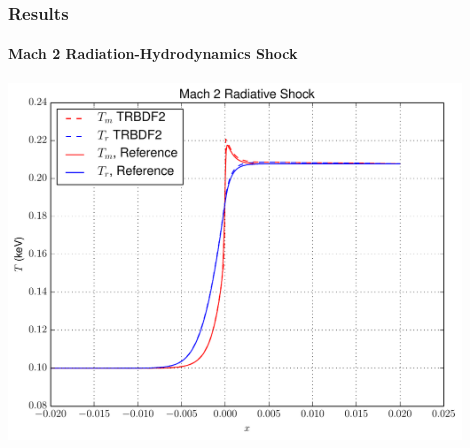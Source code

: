 \documentclass{beamer}
\begin{document}
\begin{frame}
\frametitle{Results}
\framesubtitle{Mach 2 Radiation-Hydrodynamics Shock}

\begin{center}
\includegraphics[width=0.9\textwidth]{./figures/mach2_shock.pdf}
\end{center}

\end{frame}
\end{document}
